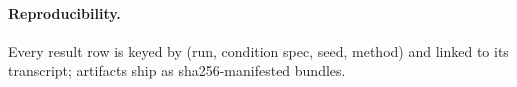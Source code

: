 \paragraph{Reproducibility.} Every result row is keyed by (run, condition spec, seed,
method) and linked to its transcript; artifacts ship as sha256-manifested bundles.
